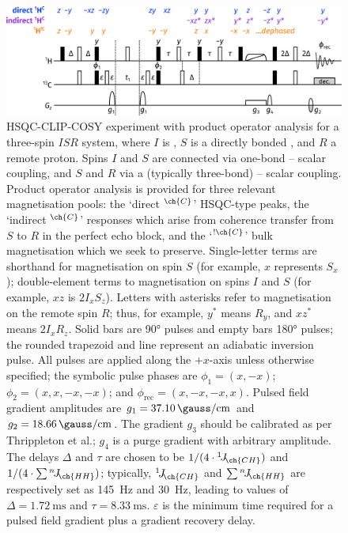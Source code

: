 \documentclass[a4paper,12pt]{article}
\newcommand{\proton}{\ch{^{1}H}}
\newcommand{\carbon}{\ch{^{13}C}}
\newcommand{\CH}{\carbon{}--\proton{}}
\newcommand{\HH}{\proton{}--\proton{}}
\newcommand{\magn}[1]{\ch{^1H}$^{\ch{#1}}$}
\newcommand{\magnnot}[1]{\ch{^1H}$^{!\ch{#1}}$}
\newcommand{\oneJ}[1]{{}^{1}\!J_{\!\ch{#1}}}
\newcommand{\nJ}[1]{{}^{n}\!J_{\!\ch{#1}}}
\begin{document}
\begin{refsection}
\begin{figure}[!ht]
    \centering
    \includegraphics[]{clip_po.png}%
    \caption[HSQC-CLIP-COSY experiment]{
        HSQC-CLIP-COSY experiment with product operator analysis for a three-spin $ISR$ system, where $I$ is \carbon{}, $S$ is a directly bonded \proton{}, and $R$ a remote proton.
        Spins $I$ and $S$ are connected via one-bond \CH{} scalar coupling, and $S$ and $R$ via a (typically three-bond) \HH{} scalar coupling.
        Product operator analysis is provided for three relevant magnetisation pools: the `direct \magn{C}' HSQC-type peaks, the `indirect \magn{C}' responses which arise from coherence transfer from $S$ to $R$ in the perfect echo block, and the `\magnnot{C}' bulk magnetisation which we seek to preserve.
        Single-letter terms are shorthand for magnetisation on spin $S$ (for example, $x$ represents $S_x$); double-element terms to magnetisation on spins $I$ and $S$ (for example, $xz$ is $2I_xS_z$).
        Letters with asterisks refer to magnetisation on the remote spin $R$; thus, for example, $y^*$ means $R_y$, and $xz^*$ means $2I_xR_z$.
        Solid bars are \ang{90} pulses and empty bars \ang{180} pulses; the rounded trapezoid and line represent an adiabatic inversion pulse.
        All pulses are applied along the $+x$-axis unless otherwise specified; the symbolic pulse phases are $\phi_1 = (x, -x)$; $\phi_2 = (x, x, -x, -x)$; and $\phi_{\text{rec}} = (x, -x, -x, x)$.
        Pulsed field gradient amplitudes are $g_1 = \qty{37.10}{\gauss\per\cm}$ and $g_2 = \qty{18.66}{\gauss\per\cm}$.
        The gradient $g_3$ should be calibrated as per Thrippleton et al.\autocite{Thrippleton2003ACIE}; $g_4$ is a purge gradient with arbitrary amplitude.
        The delays $\Delta$ and $\tau$ are chosen to be $1 / (4 \cdot \oneJ{CH})$ and $1 / (4 \cdot \sum \nJ{HH})$; typically, $\oneJ{CH}$ and $\sum \nJ{HH}$ are respectively set as \qty{145}{\Hz} and \qty{30}{\Hz}, leading to values of $\Delta = \qty{1.72}{\ms}$ and $\tau = \qty{8.33}{\ms}$.
        $\varepsilon$ is the minimum time required for a pulsed field gradient plus a gradient recovery delay.
    }
    \label{fig:hsqcc_clip_po}
\end{figure}


\end{refsection}
\end{document}

